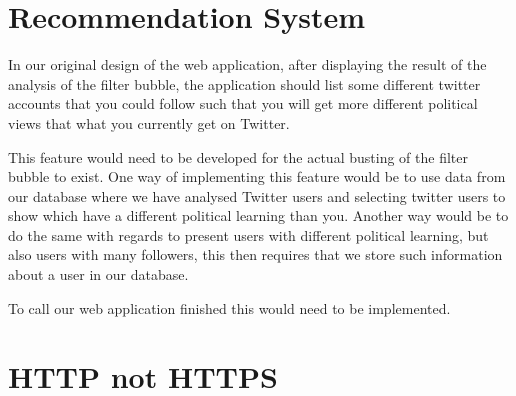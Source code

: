 \section{Recommendation System}
In our original design of the web application, after displaying the result of
the analysis of the filter bubble, the application should list some different
twitter accounts that you could follow such that you will get more different
political views that what you currently get on Twitter. \nl

This feature would need to be developed for the actual busting of the filter
bubble to exist. One way of implementing this feature would be to use data from
our database where we have analysed Twitter users and selecting twitter users to
show which have a different political learning than you. Another way would be to
do the same with regards to present users with different political learning, but
also users with many followers, this then requires that we store such
information about a user in our database.\nl

To call our web application finished this would need to be implemented.
\section{HTTP not HTTPS}
